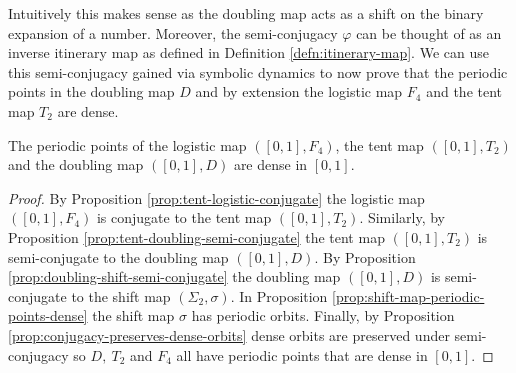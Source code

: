 Intuitively this makes sense as the doubling map acts as a shift on the binary expansion of a number. Moreover, the semi-conjugacy $\varphi$ can be thought of as an inverse itinerary map as defined in Definition \ref{defn:itinerary-map}. We can use this semi-conjugacy gained via symbolic dynamics to now prove that the periodic points in the doubling map $D$ and by extension the logistic map $F_4$ and the tent map $T_2$ are dense.

\begin{prop} \label{prop:logisitc-tent-doubling-periodic-dense}
    The periodic points of the logistic map $([0, 1], F_4)$, the tent map $([0, 1], T_2)$ and the doubling map $([0, 1], D)$ are dense in $[0, 1]$.
    \begin{proof}
    By Proposition \ref{prop:tent-logistic-conjugate} the logistic map $([0, 1], F_4)$ is conjugate to the tent map $([0, 1], T_2)$. Similarly, by Proposition \ref{prop:tent-doubling-semi-conjugate} the tent map $([0, 1], T_2)$ is semi-conjugate to the doubling map $([0, 1], D)$. By Proposition \ref{prop:doubling-shift-semi-conjugate} the doubling map $([0, 1], D)$ is semi-conjugate to the shift map $(\Sigma_2, \sigma)$. In Proposition \ref{prop:shift-map-periodic-points-dense} the shift map $\sigma$ has periodic orbits. Finally, by Proposition \ref{prop:conjugacy-preserves-dense-orbits} dense orbits are preserved under semi-conjugacy so $D, \ T_2$ and $F_4$ all have periodic points that are dense in $[0, 1]$.
    \end{proof}
\end{prop}

\begin{center}
\end{center}

